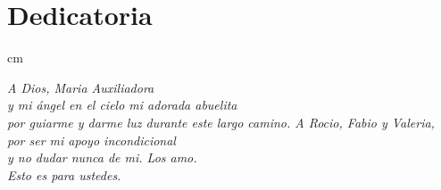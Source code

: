 \chapter*{Dedicatoria}
 cm
\begin{flushright}
   \textit{A Dios, Maria Auxiliadora\\ y mi ángel en el cielo mi adorada abuelita\\ por guiarme y darme luz durante este largo camino.
   \vskip 0.3cm A Rocio, Fabio y Valeria,\\ por ser mi apoyo incondicional\\ y no dudar nunca de mi.
   \vskip 0.5cm Los amo. \\ Esto es para ustedes.} 
\end{flushright}

